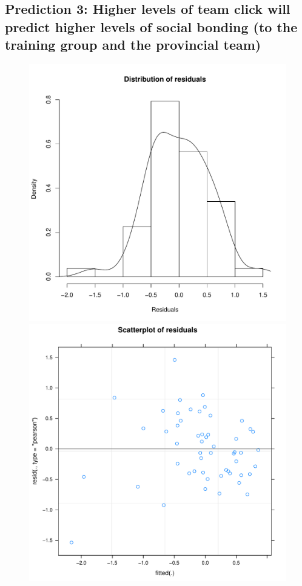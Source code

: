 \begin{CJK}{UTF8}{gbsn}
\subsection{Prediction 3: Higher levels of team click will predict higher levels of social bonding (to the training group and the provincial team)}




\begin{figure}[htbp]
    \includegraphics[scale =.4]{images/TEM2Hist.pdf}
    \includegraphics[scale =.4]{images/TEM2Scatter.pdf}

\end{figure}
\end{CJK}
